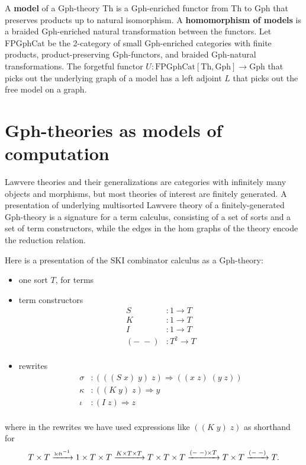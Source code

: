 \documentclass{llncs}
\newcommand{\maps}{\colon}
\newcommand{\Th}{\mathrm{Th}}
\newcommand{\Gph}{\mathrm{Gph}}
\newcommand{\FPGphCat}{\mathrm{FPGphCat}}
\begin{document}
A {\bf model} of a Gph-theory Th is a Gph-enriched functor from Th to Gph that preserves products up to natural isomorphism.  A {\bf homomorphism of models} is a braided Gph-enriched natural transformation between the functors.  Let FPGphCat be the 2-category of small Gph-enriched categories with finite products, product-preserving Gph-functors, and braided Gph-natural transformations.  The forgetful functor $U\maps \FPGphCat[\Th, \Gph] \to \Gph$ that picks out the underlying graph of a model has a left adjoint $L$ that picks out the free model on a graph.

\section{Gph-theories as models of computation}

Lawvere theories and their generalizations are categories with infinitely many objects and morphisms, but most theories of interest are finitely generated.  A presentation of underlying multisorted Lawvere theory of a finitely-generated Gph-theory is a signature for a term calculus, consisting of a set of sorts and a set of term constructors, while the edges in the hom graphs of the theory encode the reduction relation.

Here is a presentation of the SKI combinator calculus as a Gph-theory:
\begin{itemize}
  \item one sort $T$, for terms
  \item term constructors
  \[\begin{array}{rl}
    S&:1 \to T\\
    K&:1 \to T\\
    I&:1 \to T\\
    (-\; -)&: T^2 \to T\\
  \end{array}\]
  \item rewrites
  \[\begin{array}{rl}
    \sigma&:(((S\; x)\; y)\; z) \Rightarrow ((x\; z)\; (y\; z))\\
    \kappa&:((K\; y)\; z) \Rightarrow y\\
    \iota&:(I\; z) \Rightarrow z\\
  \end{array}\]
\end{itemize}
where in the rewrites we have used expressions like $((K\; y)\; z)$ as shorthand for
\[ T\times T \xrightarrow{\tiny\mbox{left}^{-1}} 1\times T \times T \xrightarrow{K \times T \times T} T\times T \times T \xrightarrow{(-\;-)\times T} T\times T \xrightarrow{(-\;-)} T. \]
\end{document}
